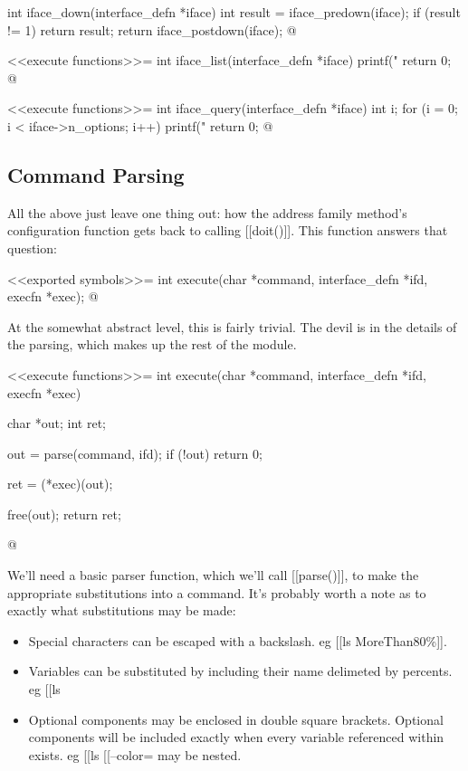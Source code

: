 \documentclass{article}
\begin{document}
int iface_down(interface_defn *iface) {
	int result = iface_predown(iface);
	if (result != 1) return result;
	return iface_postdown(iface);
}
@ 

<<execute functions>>=
int iface_list(interface_defn *iface) {
	printf("%
	return 0;
}
@

<<execute functions>>=
int iface_query(interface_defn *iface) {
	int i;
	for (i = 0; i < iface->n_options; i++) {
		printf("%
	}
	return 0;
}
@

\subsection{Command Parsing}

All the above just leave one thing out: how the address family method's
configuration function gets back to calling [[doit()]]. This function
answers that question:

<<exported symbols>>=
int execute(char *command, interface_defn *ifd, execfn *exec);
@ 

At the somewhat abstract level, this is fairly trivial. The devil is
in the details of the parsing, which makes up the rest of the module.

<<execute functions>>=
int execute(char *command, interface_defn *ifd, execfn *exec) { 
	char *out;
	int ret;

	out = parse(command, ifd);
	if (!out) { return 0; }

	ret = (*exec)(out);

	free(out);
	return ret;
}
@ 

We'll need a basic parser function, which we'll call [[parse()]], to
make the appropriate substitutions into a command. It's probably worth
a note as to exactly what substitutions may be made:

\begin{itemize}

	\item Special characters can be escaped with a backslash. eg
	[[ls MoreThan80\%]].

	\item Variables can be substituted by including their name
	delimeted by percents. eg [[ls %

	\item Optional components may be enclosed in double square
	brackets. Optional components will be included exactly when
	every variable referenced within exists. eg
	[[ls [[--color=%
	may be nested.

\end{itemize}
\end{document}
